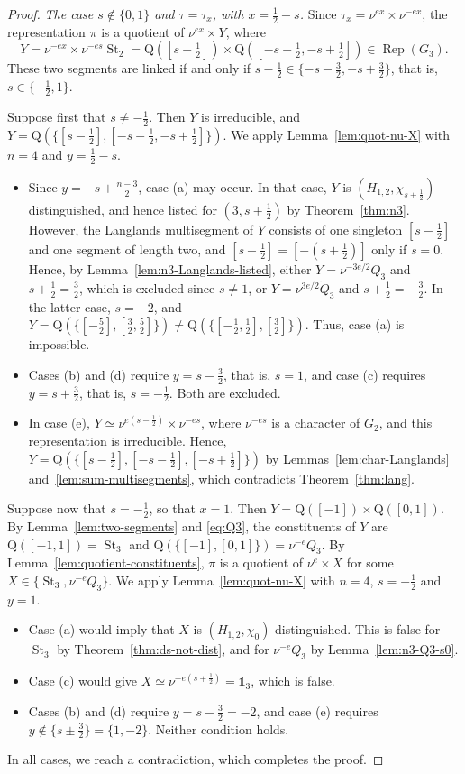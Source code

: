 \documentclass[11pt]{amsart}
\numberwithin{equation}{section}
\theoremstyle{plain}
\theoremstyle{definition}
\theoremstyle{remark}
\newcommand{\one}{\mathds{1}}
\DeclareMathOperator{\Rep}{Rep}
\DeclareMathOperator{\St}{St}
\newcommand{\Qt}{\widetilde{Q}}
\newcommand{\Qq}{\mathrm{Q}}
\begin{document}
\begin{proof}
	\emph{The case $s\notin\{0,1\}$ and $\tau=\tau_x$, with $x=\frac12-s$.} Since $\tau_x=\nu^{ex}\times\nu^{-ex}$, the representation $\pi$ is a quotient of $\nu^{ex}\times Y$, where
	$$
	Y=\nu^{-ex}\times\nu^{-es}\St_2=\Qq([s-\tfrac12])\times\Qq([-s-\tfrac12,-s+\tfrac12])\in\Rep(G_3).$$
	These two segments are linked if and only if $s-\frac12\in\{-s-\frac32,-s+\frac32\}$, that is, $s\in\{-\frac12,1\}$.
	
	Suppose first that $s\ne-\frac12$. Then $Y$ is irreducible, and $Y=\Qq(\{[s-\frac12],[-s-\frac12,-s+\frac12]\})$. We apply Lemma~\ref{lem:quot-nu-X} with $n=4$ and $y=\frac12-s$.
	\begin{itemize}
		\item Since $y=-s+\frac{n-3}2$, case (a) may occur. In that case, $Y$ is $(H_{1,2},\chi_{s+\frac12})$-distinguished, and hence listed for $(3,s+\frac12)$ by Theorem~\ref{thm:n3}. However, the Langlands multisegment of $Y$ consists of one singleton $[s-\frac12]$ and one segment of length two, and $[s-\frac12]=[-(s+\frac12)]$ only if $s=0$. Hence, by Lemma~\ref{lem:n3-Langlands-listed}, either $Y=\nu^{-3e/2}Q_3$ and $s+\frac12=\frac32$, which is excluded since $s\ne1$, or $Y=\nu^{3e/2}\Qt_3$ and $s+\frac12=-\frac32$. In the latter case, $s=-2$, and $Y=\Qq(\{[-\frac52],[\frac32,\frac52]\})\ne\Qq(\{[-\frac12,\frac12],[\frac32]\})$. Thus, case (a) is impossible.
		\item Cases (b) and (d) require $y=s-\frac32$, that is, $s=1$, and case (c) requires $y=s+\frac32$, that is, $s=-\frac12$. Both are excluded.
		\item In case (e), $Y\simeq\nu^{e(s-\frac12)}\times\nu^{-es}$, where $\nu^{-es}$ is a character of $G_2$, and this representation is irreducible. Hence, $Y=\Qq(\{[s-\frac12],[-s-\frac12],[-s+\frac12]\})$ by Lemmas~\ref{lem:char-Langlands} and~\ref{lem:sum-multisegments}, which contradicts Theorem~\ref{thm:lang}.
	\end{itemize}
	
	Suppose now that $s=-\frac12$, so that $x=1$. Then $Y=\Qq([-1])\times\Qq([0,1])$. By Lemma~\ref{lem:two-segments} and \eqref{eq:Q3}, the constituents of $Y$ are $\Qq([-1,1])=\St_3$ and $\Qq(\{[-1],[0,1]\})=\nu^{-e}Q_3$. By Lemma~\ref{lem:quotient-constituents}, $\pi$ is a quotient of $\nu^e\times X$ for some $X\in\{\St_3,\nu^{-e}Q_3\}$. We apply Lemma~\ref{lem:quot-nu-X} with $n=4$, $s=-\frac12$ and $y=1$.
	\begin{itemize}
		\item Case (a) would imply that $X$ is $(H_{1,2},\chi_0)$-distinguished. This is false for $\St_3$ by Theorem~\ref{thm:ds-not-dist}, and for $\nu^{-e}Q_3$ by Lemma~\ref{lem:n3-Q3-s0}.
		\item Case (c) would give $X\simeq\nu^{-e(s+\frac12)}=\one_3$, which is false.
		\item Cases (b) and (d) require $y=s-\frac32=-2$, and case (e) requires $y\notin\{s\pm\frac32\}=\{1,-2\}$. Neither condition holds.
	\end{itemize}
	In all cases, we reach a contradiction, which completes the proof.
\end{proof}
\end{document}

